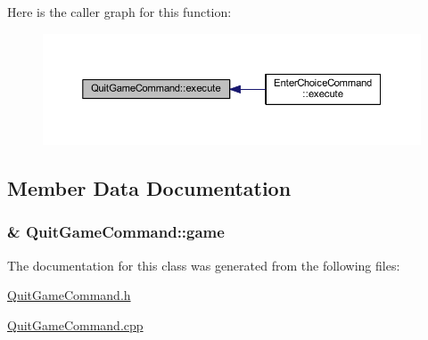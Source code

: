 Here is the caller graph for this function\+:\nopagebreak
\begin{figure}[H]
\begin{center}
\leavevmode
\includegraphics[width=350pt]{class_quit_game_command_ad39d43150a927d7e8b0dd7162eb840eb_icgraph}
\end{center}
\end{figure}




\subsection{Member Data Documentation}
\hypertarget{class_quit_game_command_a44707efd79f562af0b78b40920365ee3}{}
\subsubsection[{game}]{\& Quit\+Game\+Command\+::game\hspace{0.3cm}{\ttfamily [private]}}\label{class_quit_game_command_a44707efd79f562af0b78b40920365ee3}


The documentation for this class was generated from the following files\+:\begin{DoxyCompactItemize}
\item 
\hyperlink{_quit_game_command_8h}{Quit\+Game\+Command.\+h}\item 
\hyperlink{_quit_game_command_8cpp}{Quit\+Game\+Command.\+cpp}\end{DoxyCompactItemize}
